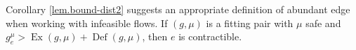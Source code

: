 \documentclass[11pt]{article}
\makeatletter
\let\comment\todo
\newcommand{\katie}[1]{\comment[nolist,color=green!40]{@katie\\ #1}}
\theoremstyle{definition}
\theoremstyle{definition}
\theoremstyle{definition}
\newcommand{\fu}{f^{\mu}}
\newcommand{\nfiu}{\nabla \fu_i}
\newcommand{\biu}{b_{i}^{\mu}}
\DeclareMathOperator{\Ex}{Ex}
\DeclareMathOperator{\Def}{Def}
\renewcommand{\todo}[1]{\hl{TODO: #1}}
\makeatother
\begin{document}
    
    Corollary \ref{lem.bound-dist2} suggests an appropriate definition of abundant edge
    when working with infeasible flows. If $(g, \mu)$ is a fitting pair with $\mu$ safe and
    $g^\mu_e > \Ex(g, \mu) + \Def(g, \mu)$, then $e$ is contractible.
\end{document}
